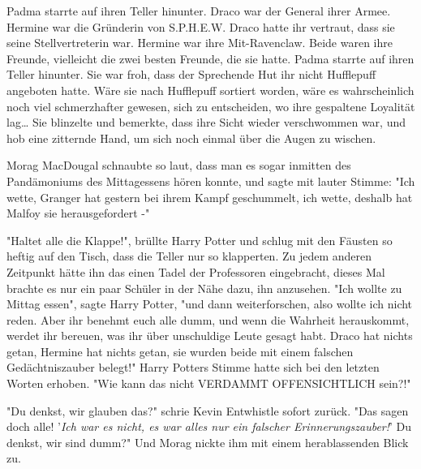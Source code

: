 {Padma starrte auf ihren Teller hinunter. Draco war der General ihrer Armee. Hermine war die Gründerin von S.P.H.E.W. Draco hatte ihr vertraut, dass sie seine Stellvertreterin war. Hermine war ihre Mit-Ravenclaw. Beide waren ihre Freunde, vielleicht die zwei besten Freunde, die sie hatte. Padma starrte auf ihren Teller hinunter. Sie war froh, dass der Sprechende Hut ihr nicht Hufflepuff angeboten hatte. Wäre sie nach Hufflepuff sortiert worden, wäre es wahrscheinlich noch viel schmerzhafter gewesen, sich zu entscheiden, wo ihre gespaltene Loyalität lag… Sie blinzelte und bemerkte, dass ihre Sicht wieder verschwommen war, und hob eine zitternde Hand, um sich noch einmal über die Augen zu wischen.

Morag MacDougal schnaubte so laut, dass man es sogar inmitten des Pandämoniums des Mittagessens hören konnte, und sagte mit lauter Stimme: "Ich wette, Granger hat gestern bei ihrem Kampf geschummelt, ich wette, deshalb hat Malfoy sie herausgefordert -"

"Haltet alle die Klappe!", brüllte Harry Potter und schlug mit den Fäusten so heftig auf den Tisch, dass die Teller nur so klapperten. Zu jedem anderen Zeitpunkt hätte ihn das einen Tadel der Professoren eingebracht, dieses Mal brachte es nur ein paar Schüler in der Nähe dazu, ihn anzusehen. "Ich wollte zu Mittag essen", sagte Harry Potter, "und dann weiterforschen, also wollte ich nicht reden. Aber ihr benehmt euch alle dumm, und wenn die Wahrheit herauskommt, werdet ihr bereuen, was ihr über unschuldige Leute gesagt habt. Draco hat nichts getan, Hermine hat nichts getan, sie wurden beide mit einem falschen Gedächtniszauber belegt!" Harry Potters Stimme hatte sich bei den letzten Worten erhoben. "Wie kann das nicht VERDAMMT OFFENSICHTLICH sein?!"

"Du denkst, wir glauben das?" schrie Kevin Entwhistle sofort zurück. "Das sagen doch alle! '\emph{Ich war es nicht, es war alles nur ein falscher Erinnerungszauber!}' Du denkst, wir sind dumm?" Und Morag nickte ihm mit einem herablassenden Blick zu.

}
